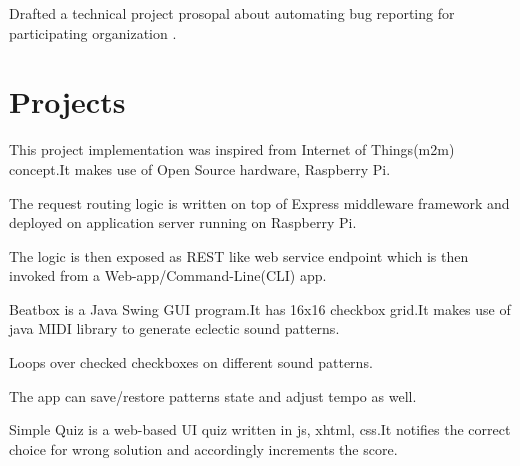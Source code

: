 \documentclass[hidelinks]{deedy-resume-openfont}
\renewcommand{\sectionsep}[0]{\vspace{8pt}}
\begin{document}
\begin{minipage}[t]{0.66\textwidth}
\begin{tightemize}
\item Drafted a technical project prosopal about automating bug reporting
  for participating organization \href{http://code.timvideos.us/home/}{}.
\end{tightemize}
\sectionsep


\section{Projects}
\descript{}
\begin{tightemize}
\item This project implementation was inspired from Internet of Things(m2m)
  concept.It makes use of Open Source hardware, Raspberry Pi.
\item The request routing logic is written on top of Express middleware
  framework and deployed on application server running on
  Raspberry Pi.
\item The logic is then exposed as REST like web service endpoint which is then
  invoked from a Web-app/Command-Line(CLI) app.
\end{tightemize}
\sectionsep

\descript{}
\begin{tightemize}
\item Beatbox is a Java Swing GUI program.It has 16x16 checkbox grid.It makes
  use of java MIDI library to generate eclectic sound patterns.
\item Loops over checked checkboxes on different sound patterns.
\item The app can save/restore patterns state and adjust tempo as well.
\end{tightemize}
\sectionsep

\descript{}
\begin{tightemize}
\item Simple Quiz is a web-based UI quiz written in js, xhtml, css.It notifies
  the correct choice for wrong solution and accordingly increments the score.
\end{tightemize}
\sectionsep


\end{minipage}
\end{document}
